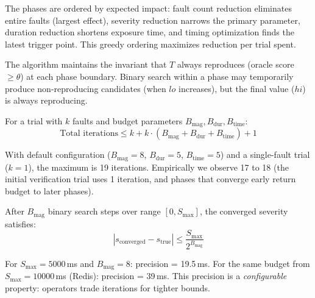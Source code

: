  The phases are ordered by expected impact: fault count
reduction eliminates entire faults (largest effect), severity reduction
narrows the primary parameter, duration reduction shortens exposure time, and
timing optimization finds the latest trigger point. This greedy ordering
maximizes reduction per trial spent.

 The algorithm maintains the invariant that $T$
always reproduces (oracle score $\geq \theta$) at each phase boundary. Binary
search within a phase may temporarily produce non-reproducing candidates (when
$lo$ increases), but the final value ($hi$) is always reproducing.

 For a trial with $k$ faults and budget parameters
$B_{\text{mag}}, B_{\text{dur}}, B_{\text{time}}$:
\begin{equation}
\text{Total iterations} \leq k + k \cdot (B_{\text{mag}} + B_{\text{dur}} + B_{\text{time}}) + 1
\end{equation}

With default configuration ($B_{\text{mag}}=8$, $B_{\text{dur}}=5$,
$B_{\text{time}}=5$) and a single-fault trial ($k=1$), the maximum is 19
iterations. Empirically we observe 17 to 18 (the initial verification trial
uses 1 iteration, and phases that converge early return budget to later phases).

 After $B_{\text{mag}}$ binary search steps over
range $[0, S_{\max}]$, the converged severity satisfies:
\begin{equation}
|s_{\text{converged}} - s_{\text{true}}| \leq \frac{S_{\max}}{2^{B_{\text{mag}}}}
\end{equation}

For $S_{\max} = 5000$\,ms and $B_{\text{mag}} = 8$: precision = 19.5\,ms.
For the same budget from $S_{\max} = 10000$\,ms (Redis): precision = 39\,ms.
This precision is a \emph{configurable} property: operators trade iterations
for tighter bounds.

